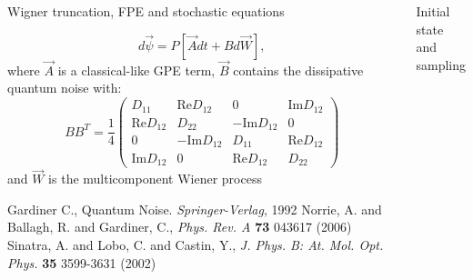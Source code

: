 \documentclass[final,hyperref={pdfpagelabels=false}]{beamer}
\begin{document}
\begin{frame}
\begin{columns}
{\begin{block}{Wigner truncation, FPE and stochastic equations}
\begin{itemize}
\[ d \vec{\psi} = P \left[ \vec{A} dt + B d\vec{W} \right], \]
where $\vec{A}$ is a classical-like GPE term,  $\vec{B}$ contains the dissipative quantum noise with:
\[
\newcommand{\ta}{D_{11}}
\newcommand{\tb}{\textrm{Re}D_{12}}
\newcommand{\tc}{\textrm{Im}D_{12}}
\newcommand{\td}{D_{22}}
B B^T = \frac{1}{4} \begin{pmatrix}
\ta & \tb & 0 & \tc \\
\tb & \td & -\tc & 0 \\
0 & -\tc & \ta & \tb \\
\tc & 0 & \tb & \td
\end{pmatrix}
\]
and $\vec{W}$ is the multicomponent Wiener process
\end{itemize}

\tiny{ \begin{thebibliography}{9}
	 Gardiner C., Quantum Noise. \textit{Springer-Verlag}, 1992
	 Norrie, A. and Ballagh, R. and Gardiner, C., \textit{Phys. Rev. A} \textbf{73} 043617 (2006)
	 Sinatra, A. and Lobo, C. and Castin, Y., \textit{J. Phys. B: At. Mol. Opt. Phys.} \textbf{35} 3599-3631 (2002)
\end{thebibliography} }

\end{block}

\begin{block}{Initial state and sampling}


\end{block}}
\end{columns}
\end{frame}
\end{document}
